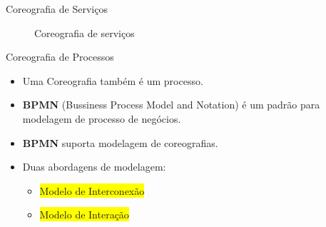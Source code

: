 \documentclass[xcolor=svgnames]{beamer}
\begin{document}
\begin{frame}{Coreografia de Serviços}
{\begin{figure}[!h]
                  \caption{Coreografia de serviços}
              \end{figure}	
          }
    \end{frame}

    \begin{frame}{Coreografia de Processos}
      \begin{itemize}
	\item <1-> Uma Coreografia também é um processo.
	\item <2-> \textbf{BPMN} (Bussiness Process Model and Notation) é um padrão para modelagem de processo de negócios.
	\item <2-> \textbf{BPMN} suporta modelagem de coreografias.
	\item <3-> Duas abordagens de modelagem:
	  \begin{itemize}
	    \item <3-> \colorbox{yellow}{Modelo de Interconexão}%
	    \item <4-> \colorbox{yellow}{Modelo de Interação}%
	  \end{itemize}
      \end{itemize}

    \end{frame}
\end{document}
